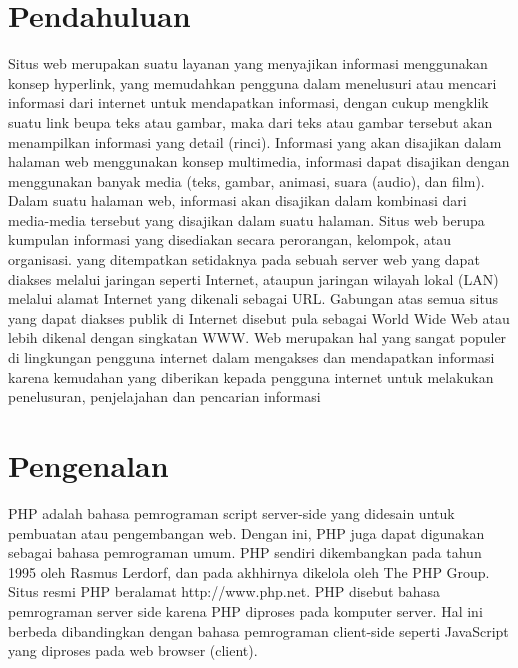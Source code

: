 \section{Pendahuluan}
	Situs web merupakan suatu layanan yang menyajikan informasi menggunakan konsep hyperlink, yang memudahkan pengguna dalam menelusuri atau mencari informasi dari internet untuk mendapatkan informasi, dengan cukup mengklik suatu link beupa teks atau gambar, maka dari teks atau gambar tersebut akan menampilkan informasi yang detail (rinci).
Informasi yang akan disajikan dalam halaman web menggunakan konsep multimedia, informasi dapat disajikan dengan menggunakan banyak media (teks, gambar, animasi, suara (audio), dan film). Dalam suatu halaman web, informasi akan disajikan dalam kombinasi dari media-media tersebut yang disajikan dalam suatu halaman.
	Situs web berupa kumpulan informasi yang disediakan secara perorangan, kelompok, atau organisasi. yang ditempatkan setidaknya pada sebuah server web yang dapat diakses melalui jaringan seperti Internet, ataupun jaringan wilayah lokal (LAN) melalui alamat Internet yang dikenali sebagai URL. Gabungan atas semua situs yang dapat diakses publik di Internet disebut pula sebagai World Wide Web atau lebih dikenal dengan singkatan WWW. Web merupakan hal yang sangat populer di lingkungan pengguna internet dalam mengakses dan mendapatkan informasi karena kemudahan yang diberikan kepada pengguna internet untuk melakukan penelusuran, penjelajahan dan pencarian informasi   
\section{Pengenalan}
PHP adalah bahasa pemrograman script server-side yang didesain untuk pembuatan atau pengembangan web.
Dengan ini, PHP juga dapat digunakan sebagai bahasa pemrograman umum. PHP sendiri dikembangkan pada tahun 1995
oleh Rasmus Lerdorf, dan pada akhhirnya dikelola oleh The PHP Group. Situs resmi PHP beralamat http://www.php.net.
PHP disebut bahasa pemrograman server side karena PHP diproses pada komputer server. 
Hal ini berbeda dibandingkan dengan bahasa pemrograman client-side seperti JavaScript yang diproses pada web browser (client).


